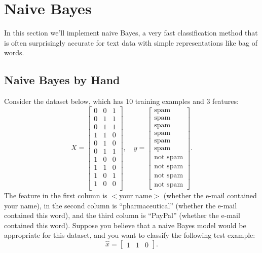 \documentclass{article}
\begin{document}
	
	\section{Naive Bayes}
	
	In this section we'll implement naive Bayes, a very fast classification method that is often surprisingly accurate for text data with simple representations like bag of words.
	
	
	
	\subsection{Naive Bayes by Hand}
	
	Consider the dataset below, which has $10$ training examples and $3$ features:
	\[
	X = \begin{bmatrix}0 & 0 & 1\\0 & 1 & 1\\ 0 & 1 & 1\\ 1 & 1 & 0\\0 & 1 & 0\\0 & 1 & 1\\1 & 0 & 0\\1 & 1 & 0\\1 & 0 & 1\\1 & 0 & 0\\\end{bmatrix}, \quad y = \begin{bmatrix}\text{spam}\\\text{spam}\\\text{spam}\\\text{spam}\\\text{spam}\\\text{spam}\\\text{not spam}\\\text{not spam}\\\text{not spam}\\\text{not spam}\end{bmatrix}.
	\]
	The feature in the first column is $<$your name$>$ (whether the e-mail contained your name), in the second column is ``pharmaceutical'' (whether the e-mail contained this word), and the third column is ``PayPal'' (whether the e-mail contained this word).
	Suppose you believe that a naive Bayes model would be appropriate for this dataset, and you want to classify the following test example:
	\[
	\hat{x} = \begin{bmatrix}1 & 1 & 0\end{bmatrix}.
	\]
	
\end{document}
